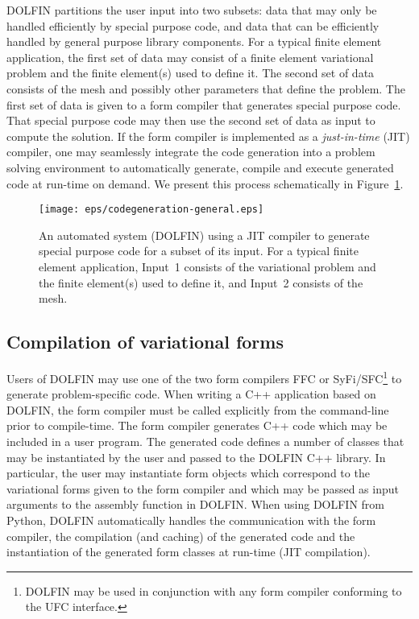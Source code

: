 \documentclass[acmtoms]{acmtrans2m}
\newcommand{\dolfin}{DOLFIN}
\begin{document}
\dolfin{} partitions the user input into two subsets: data that may
only be handled efficiently by special purpose code, and data that can
be efficiently handled by general purpose library
components. For a typical finite element application, the first set of
data may consist of a finite element variational problem and the
finite element(s) used to define it. The second set of data consists
of the mesh and possibly other parameters that define the problem. The
first set of data is given to a form compiler that generates special
purpose code. That special purpose code may then use the second set of
data as input to compute the solution. If the form compiler is
implemented as a \emph{just-in-time} (JIT) compiler, one may
seamlessly integrate the code generation into a problem solving
environment to automatically generate, compile and execute generated
code at run-time on demand. We present this process schematically in
Figure~\ref{fig:codegeneration}.
\begin{figure}
  \begin{center}
    \texttt{[image: eps/codegeneration-general.eps]}
    \caption{An automated system (\dolfin{}) using a JIT compiler
      to generate special purpose code for a subset of
      its input. For a typical finite element application, Input~1
      consists of the variational problem and the finite element(s)
      used to define it, and Input~2 consists of the mesh.}
    \label{fig:codegeneration}
  \end{center}
\end{figure}

\subsection{Compilation of variational forms}

Users of \dolfin{} may use one of the two form compilers FFC or
SyFi/SFC\footnote{\dolfin{} may be used in conjunction with any form
  compiler conforming to the UFC interface.} to generate
problem-specific code. When writing a C++ application based on
\dolfin{}, the form compiler must be called explicitly from the
command-line prior to compile-time. The form compiler generates C++
code which may be included in a user program. The generated code
defines a number of classes that may be instantiated by the user and
passed to the \dolfin{} C++ library. In particular, the user may
instantiate form objects which correspond to the variational forms
given to the form compiler and which may be passed as input arguments
to the assembly function in \dolfin{}. When using \dolfin{} from
Python, \dolfin{} automatically handles the communication with the
form compiler, the compilation (and caching) of the generated code and the
instantiation of the generated form classes at run-time (JIT
compilation).
\end{document}
